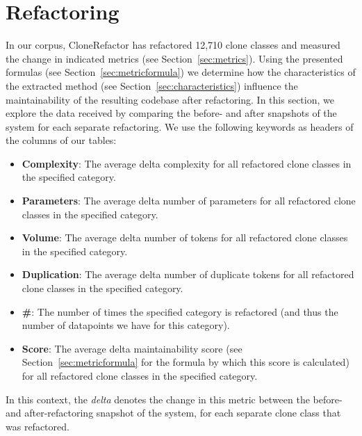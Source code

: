 \section{Refactoring} \label{sec:refactoringexperiments}
In our corpus, CloneRefactor has refactored 12,710 clone classes and measured the change in indicated metrics (see Section~\ref{sec:metrics}). Using the presented formulas (see Section~\ref{sec:metricformula}) we determine how the characteristics of the extracted method (see Section~\ref{sec:characteristics}) influence the maintainability of the resulting codebase after refactoring. In this section, we explore the data received by comparing the before- and after snapshots of the system for each separate refactoring. We use the following keywords as headers of the columns of our tables:
\begin{itemize}
  \item \textbf{Complexity}: The average delta complexity for all refactored clone classes in the specified category.
  \item \textbf{Parameters}: The average delta number of parameters for all refactored clone classes in the specified category.
  \item \textbf{Volume}: The average delta number of tokens for all refactored clone classes in the specified category.
  \item \textbf{Duplication}: The average delta number of duplicate tokens for all refactored clone classes in the specified category.
  \item \textbf{\#}: The number of times the specified category is refactored (and thus the number of datapoints we have for this category).
  \item \textbf{Score}: The average delta maintainability score (see Section~\ref{sec:metricformula} for the formula by which this score is calculated) for all refactored clone classes in the specified category.
\end{itemize}
In this context, the \textit{delta} denotes the change in this metric between the before- and after-refactoring snapshot of the system, for each separate clone class that was refactored.

